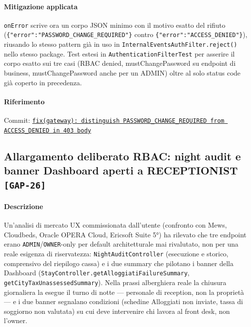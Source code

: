﻿\documentclass[a4paper,12pt]{report}
\newcommand{\commitref}[2]{\texttt{\small \href{https://github.com/diegoandruccioli/hotel-pms/commit/#1}{#2}}}
\newcommand{\threat}[1]{\texttt{\small\textcolor{vulnred}{[#1]}}}
\begin{document}
\paragraph{Mitigazione applicata}
\texttt{onError} scrive ora un corpo JSON minimo con il motivo esatto del rifiuto
(\texttt{\{"error":"PASSWORD\_CHANGE\_REQUIRED"\}} contro
\texttt{\{"error":"ACCESS\_DENIED"\}}), riusando lo stesso pattern già in uso in
\texttt{InternalEventsAuthFilter.reject()} nello stesso package. Test estesi in
\texttt{AuthenticationFilterTest} per asserire il corpo esatto sui tre casi (RBAC
denied, mustChangePassword su endpoint di business, mustChangePassword anche per un
ADMIN) oltre al solo status code già coperto in precedenza.

\paragraph{Riferimento} Commit: \commitref{a33ed7ff}{fix(gateway): distinguish PASSWORD\_CHANGE\_REQUIRED from ACCESS\_DENIED in 403 body}

\subsection{Allargamento deliberato RBAC: night audit e banner Dashboard aperti a RECEPTIONIST \threat{GAP-26}}

\paragraph{Descrizione}
Un'analisi di mercato UX commissionata dall'utente (confronto con Mews, Cloudbeds,
Oracle OPERA Cloud, Ericsoft Suite 5°) ha rilevato che tre endpoint erano
\texttt{ADMIN}/\texttt{OWNER}-only per default architetturale mai rivalutato, non per
una reale esigenza di riservatezza: \texttt{NightAuditController} (esecuzione e storico,
comprensivo del riepilogo cassa) e i due summary che pilotano i banner della Dashboard
(\texttt{StayController.getAlloggiatiFailureSummary},
\texttt{getCityTaxUnassessedSummary}). Nella prassi alberghiera reale la chiusura
giornaliera la esegue il turno di notte --- personale di reception, non la proprietà ---
e i due banner segnalano condizioni (schedine Alloggiati non inviate, tassa di soggiorno
non valutata) su cui deve intervenire chi lavora al front desk, non l'owner.
\end{document}
